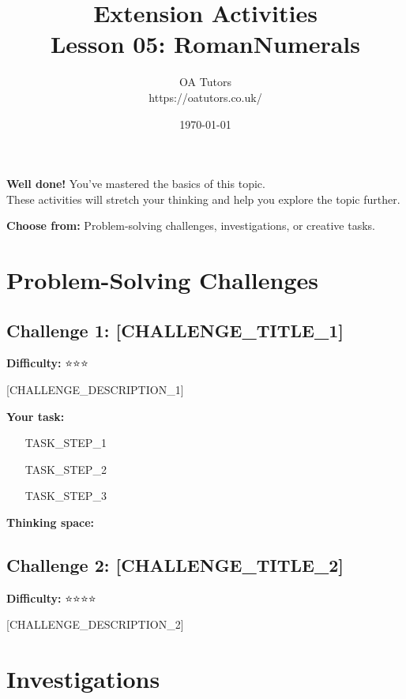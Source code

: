 \documentclass[a4paper,12pt]{article}
\begin{document}
\title{\textcolor{oagreen}{\Huge Extension Activities} \\ 
       \textcolor{oablue}{\Large Lesson 05: RomanNumerals}}
\author{\textcolor{oablue}{OA Tutors} \\ 
        \textcolor{oagray}{https://oatutors.co.uk/}}
\date{\textcolor{oagray}{\today}}

\maketitle

\begin{challenge}
\textbf{Well done!} You've mastered the basics of this topic. \\
These activities will stretch your thinking and help you explore the topic further.

\textbf{Choose from:} Problem-solving challenges, investigations, or creative tasks.
\end{challenge}

\section{Problem-Solving Challenges}

\subsection{Challenge 1: [CHALLENGE_TITLE_1]}
\textbf{Difficulty:} ⭐⭐⭐

[CHALLENGE_DESCRIPTION_1]

\textbf{Your task:}
\begin{enumerate}
    \item [TASK_STEP_1]
    \item [TASK_STEP_2]
    \item [TASK_STEP_3]
\end{enumerate}

\textbf{Thinking space:}

\vspace{4cm}

\subsection{Challenge 2: [CHALLENGE_TITLE_2]}
\textbf{Difficulty:} ⭐⭐⭐⭐

[CHALLENGE_DESCRIPTION_2]

\vspace{4cm}

\section{Investigations}
\end{document}
